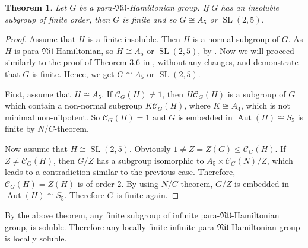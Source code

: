\documentclass[11pt]{amsart}
\newtheorem{theorem}{Theorem}[section]
\DeclareMathOperator{\Aut}{Aut}
\DeclareMathOperator{\SL}{SL}
\newcommand{\sub}{\leqslant}
\newcommand{\C}{\mathcal{ C}}
\newcommand{\nil}{\mathfrak{Nil}}
\begin{document}
\begin{theorem}\label{T-3.10}
Let $G$ be a para-$\mathfrak{Nil}$-Hamiltonian group. If $G$ has an insoluble subgroup of finite order, then $G$ is finite and so $G\cong A_5$ or $\SL(2,5)$.
\end{theorem}
\begin{proof}
Assume that $H$ is a finite insoluble. Then $H$ is a  normal subgroup of $G$. As $H$ is para-$\nil$-Hamiltonian, so $H\cong A_5$ or $\SL(2,5)$, by \cite[Theorem 3.6]{DM}. Now we will proceed similarly to the proof of Theorem 3.6 in \cite{DM}, without any changes, and demonstrate that $G$ is finite. Hence, we get $G\cong A_5$ or $\SL(2,5)$.

First, assume that $H\cong A_5$. If $\C_G(H)\neq 1$, then $H\C_G(H)$ is a subgroup of $G$ which contain a non-normal subgroup $K\C_G(H)$, where $K\cong A_4$, which is not  minimal non-nilpotent. So $\C_G(H)=1$ and $G$ is embedded in $\Aut(H)\cong S_5$ is finite by $N/C$-theorem.

Now assume that $H\cong \SL(2,5)$. Obviously  $1\neq Z=Z(G)\sub\C_G(H)$. If $Z\neq \C_G(H)$, then $G/Z$ has a subgroup isomorphic to $A_5\times \C_G(N)/Z$, which leads to a contradiction similar to the previous case. Therefore, $\C_G(H)=Z(H)$ is of order $2$. By using $N/C$-theorem, $G/Z$  is embedded in  $\Aut(H)\cong S_5$. Therefore $G$ is finite again.
\end{proof}
By the above theorem, any finite subgroup of infinite para-$\nil$-Hamiltonian group, is soluble. Therefore any locally finite infinite para-$\nil$-Hamiltonian group is locally soluble.
\end{document}
